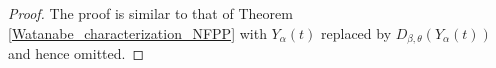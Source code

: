 \documentclass[10pt,a4paper]{amsart}
\begin{document}
\begin{proof}   
The proof is similar to that of Theorem \ref{Watanabe_characterization_NFPP} with $Y_{\alpha}(t)$ replaced by $D_{\beta,\theta}(Y_{\alpha}(t))$ and hence omitted.

   

\end{proof}
\end{document}
